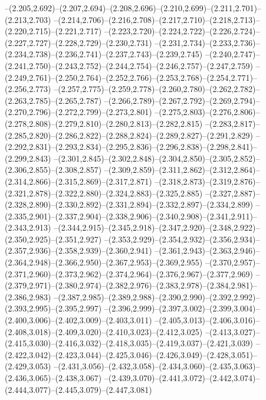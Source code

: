   --(2.205,2.692)--(2.207,2.694)--(2.208,2.696)--(2.210,2.699)--(2.211,2.701)--(2.213,2.703)%
  --(2.214,2.706)--(2.216,2.708)--(2.217,2.710)--(2.218,2.713)--(2.220,2.715)--(2.221,2.717)%
  --(2.223,2.720)--(2.224,2.722)--(2.226,2.724)--(2.227,2.727)--(2.228,2.729)--(2.230,2.731)%
  --(2.231,2.734)--(2.233,2.736)--(2.234,2.738)--(2.236,2.741)--(2.237,2.743)--(2.239,2.745)%
  --(2.240,2.747)--(2.241,2.750)--(2.243,2.752)--(2.244,2.754)--(2.246,2.757)--(2.247,2.759)%
  --(2.249,2.761)--(2.250,2.764)--(2.252,2.766)--(2.253,2.768)--(2.254,2.771)--(2.256,2.773)%
  --(2.257,2.775)--(2.259,2.778)--(2.260,2.780)--(2.262,2.782)--(2.263,2.785)--(2.265,2.787)%
  --(2.266,2.789)--(2.267,2.792)--(2.269,2.794)--(2.270,2.796)--(2.272,2.799)--(2.273,2.801)%
  --(2.275,2.803)--(2.276,2.806)--(2.278,2.808)--(2.279,2.810)--(2.280,2.813)--(2.282,2.815)%
  --(2.283,2.817)--(2.285,2.820)--(2.286,2.822)--(2.288,2.824)--(2.289,2.827)--(2.291,2.829)%
  --(2.292,2.831)--(2.293,2.834)--(2.295,2.836)--(2.296,2.838)--(2.298,2.841)--(2.299,2.843)%
  --(2.301,2.845)--(2.302,2.848)--(2.304,2.850)--(2.305,2.852)--(2.306,2.855)--(2.308,2.857)%
  --(2.309,2.859)--(2.311,2.862)--(2.312,2.864)--(2.314,2.866)--(2.315,2.869)--(2.317,2.871)%
  --(2.318,2.873)--(2.319,2.876)--(2.321,2.878)--(2.322,2.880)--(2.324,2.883)--(2.325,2.885)%
  --(2.327,2.887)--(2.328,2.890)--(2.330,2.892)--(2.331,2.894)--(2.332,2.897)--(2.334,2.899)%
  --(2.335,2.901)--(2.337,2.904)--(2.338,2.906)--(2.340,2.908)--(2.341,2.911)--(2.343,2.913)%
  --(2.344,2.915)--(2.345,2.918)--(2.347,2.920)--(2.348,2.922)--(2.350,2.925)--(2.351,2.927)%
  --(2.353,2.929)--(2.354,2.932)--(2.356,2.934)--(2.357,2.936)--(2.358,2.939)--(2.360,2.941)%
  --(2.361,2.943)--(2.363,2.946)--(2.364,2.948)--(2.366,2.950)--(2.367,2.953)--(2.369,2.955)%
  --(2.370,2.957)--(2.371,2.960)--(2.373,2.962)--(2.374,2.964)--(2.376,2.967)--(2.377,2.969)%
  --(2.379,2.971)--(2.380,2.974)--(2.382,2.976)--(2.383,2.978)--(2.384,2.981)--(2.386,2.983)%
  --(2.387,2.985)--(2.389,2.988)--(2.390,2.990)--(2.392,2.992)--(2.393,2.995)--(2.395,2.997)%
  --(2.396,2.999)--(2.397,3.002)--(2.399,3.004)--(2.400,3.006)--(2.402,3.009)--(2.403,3.011)%
  --(2.405,3.013)--(2.406,3.016)--(2.408,3.018)--(2.409,3.020)--(2.410,3.023)--(2.412,3.025)%
  --(2.413,3.027)--(2.415,3.030)--(2.416,3.032)--(2.418,3.035)--(2.419,3.037)--(2.421,3.039)%
  --(2.422,3.042)--(2.423,3.044)--(2.425,3.046)--(2.426,3.049)--(2.428,3.051)--(2.429,3.053)%
  --(2.431,3.056)--(2.432,3.058)--(2.434,3.060)--(2.435,3.063)--(2.436,3.065)--(2.438,3.067)%
  --(2.439,3.070)--(2.441,3.072)--(2.442,3.074)--(2.444,3.077)--(2.445,3.079)--(2.447,3.081)%
